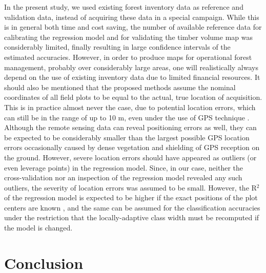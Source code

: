 In the present study, we used existing forest inventory data as reference and validation data, instead of acquiring these data in a special campaign. While this is in general both time and cost saving, the number of available reference data for calibrating the regression model and for validating the timber volume map was considerably limited, finally resulting in large confidence intervals of the estimated accuracies. However, in order to produce maps for operational forest management, probably over considerably large areas, one will realistically always depend on the use of existing inventory data due to limited financial resources. It should also be mentioned that the proposed methods assume the nominal coordinates of all field plots to be equal to the actual, true location of acquisition. This is in practice almost never the case, due to potential location errors, which can still be in the range of up to 10 m, even under the use of GPS technique \citep{mauro2010, steinmann2013}. Although the remote sensing data can reveal positioning errors as well, they can be expected to be considerably smaller than the largest possible GPS location errors occasionally caused by dense vegetation and shielding of GPS reception on the ground. However, severe location errors should have appeared as outliers (or even leverage points) in the regression model. Since, in our case, neither the cross-validation nor an inspection of the regression model revealed any such outliers, the severity of location errors was assumed to be small. However, the R$^2$ of the regression model is expected to be higher if the exact positions of the plot centers are known \citep{fuller2009}, and the same can be assumed for the classification accuracies under the restriction that the locally-adaptive class width must be recomputed if the model is changed.



\section{Conclusion}
\label{sec:conc}

